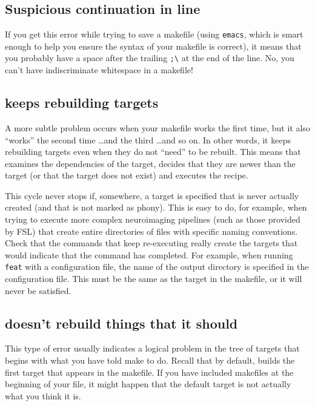 \subsection{Suspicious continuation in line \mypound{}} %

If you get this error while trying to save a makefile (using \texttt{emacs}, which is smart enough to help you ensure the syntax of your makefile is correct), it means that you probably have a space after the trailing \texttt{;\textbackslash} at the end of the line. No, you can't have indiscriminate whitespace in a makefile!

\subsection{\maken{} keeps rebuilding targets}

A more subtle problem occurs when your makefile works the first time, but it also ``works'' the second time \ldots and the third \ldots and so on. In other words, it keeps rebuilding targets even when they do not ``need'' to be rebuilt. This means that \maken{} examines the dependencies of the target, decides that they are newer than the target (or that the target does not exist) and executes the recipe.

This cycle never stops if, somewhere, a target is specified that is never actually created (and that is not marked as phony). This is easy to do, for example, when trying to execute more complex neuroimaging pipelines (such as those provided by FSL) that create entire directories of files with specific naming conventions. Check that the commands that keep re-executing really create the targets that would indicate that the command has completed. For example, when running \texttt{feat} with a configuration file, the name of the output directory is specified in the configuration file. This must be the same as the target in the makefile, or it will never be satisfied.

\subsection{\maken{} doesn't rebuild things that it should}

This type of error usually indicates a logical problem in the tree of targets that begins with what you have told make to do. Recall that by default, \maken{} builds the first target that appears in the makefile. If you have included makefiles at the beginning of your file, it might happen that the default target is not actually what you think it is.

